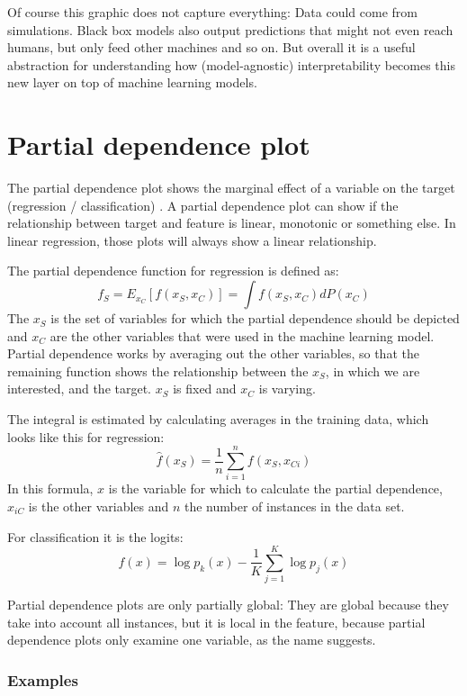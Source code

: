 \documentclass[12pt,]{krantz}
\theoremstyle{definition}
\theoremstyle{definition}
\theoremstyle{definition}
\theoremstyle{remark}
\begin{document}
Of course this graphic does not capture everything: Data could come from
simulations. Black box models also output predictions that might not
even reach humans, but only feed other machines and so on. But overall
it is a useful abstraction for understanding how (model-agnostic)
interpretability becomes this new layer on top of machine learning
models.

\section{Partial dependence plot}\label{pdp}

The partial dependence plot shows the marginal effect of a variable on
the target (regression / classification) \citep{friedman2001greedy}. A
partial dependence plot can show if the relationship between target and
feature is linear, monotonic or something else. In linear regression,
those plots will always show a linear relationship.

The partial dependence function for regression is defined as:
\[f_S = E_{x_C}[f(x_S, x_C)] = \int f(x_S, x_C) dP(x_C)\] The \(x_S\) is
the set of variables for which the partial dependence should be depicted
and \(x_C\) are the other variables that were used in the machine
learning model. Partial dependence works by averaging out the other
variables, so that the remaining function shows the relationship between
the \(x_S\), in which we are interested, and the target. \(x_S\) is
fixed and \(x_C\) is varying.

The integral is estimated by calculating averages in the training data,
which looks like this for regression:
\[ \hat{f}(x_S) = \frac{1}{n} \sum_{i=1}^n f(x_S, x_{Ci}) \] In this
formula, \(x\) is the variable for which to calculate the partial
dependence, \(x_{iC}\) is the other variables and \(n\) the number of
instances in the data set.

For classification it is the logits:
\[ f(x) = \log p_k(x) - \frac{1}{K} \sum_{j=1}^K \log p_j(x) \]

Partial dependence plots are only partially global: They are global
because they take into account all instances, but it is local in the
feature, because partial dependence plots only examine one variable, as
the name suggests.

\subsubsection{Examples}\label{examples}
\end{document}
